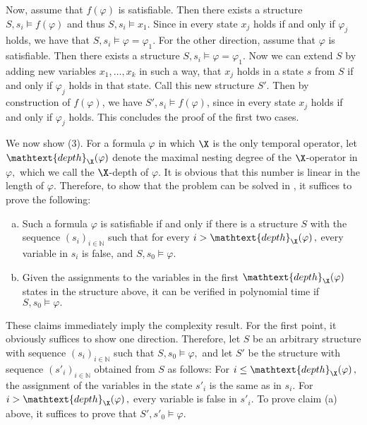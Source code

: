     Now, assume that $f(\varphi)$ is satisfiable. Then there exists a structure
    $S, s_i \vDash f(\varphi)$ and thus $S, s_i \vDash x_1$. Since in every state $x_j$ holds if and only if $\varphi_j$ holds,
    we have that $S, s_i \vDash \varphi = \varphi_1$. For the other direction, assume that $\varphi$ is satisfiable.
    Then there exists a structure $S,s_i \vDash \varphi=\varphi_1$. Now we can extend $S$ by adding new variables
    $x_1,\dots,x_k$ in such a way, that $x_j$ holds in a state $s$ from $S$ if and only if $\varphi_j$ holds in that state.
    Call this new structure $S'$. Then by construction of $f(\varphi)$, we have $S',s_i \vDash f(\varphi)$, since in every state
    $x_j$ holds if and only if $\varphi_j$ holds.
    \ifreport
      This concludes the proof of the first two cases.

      \bigskip\noindent
    \newcommand{\xdepth}[1]{\mathtext{depth}_{\X}\!\left(#1\right)}We now show (3). For a formula $\varphi$ in which $\X$ is the only temporal operator, let $\xdepth\varphi$ denote the maximal nesting degree of the $\X$-operator in $\varphi,$ which we call the $\X$-depth of $\varphi.$ It is obvious that this number is linear in the length of $\varphi.$ Therefore, to show that the problem can be solved in \NP, it suffices to prove the following:

    \begin{enumerate}[(a)]
	\item Such a formula $\varphi$ is satisfiable if and only if there is a structure $S$ with the sequence $(s_i)_{i\in\mathbb N}$ such that for every $i>\xdepth\varphi,$ every variable in $s_i$ is false, and $S,s_0\models\varphi.$
        \item Given the assignments to the variables in the first $\xdepth\varphi$ states in the structure above, it can be verified in polynomial time if $S,s_0\models\varphi.$
    \end{enumerate}

    These claims immediately imply the complexity result. For the first point, it obviously suffices to show one direction. Therefore, let $S$ be an arbitrary structure with sequence $(s_i)_{i\in\mathbb{N}}$ such that $S,s_0\models\varphi,$ and let $S'$ be the structure with sequence $(s'_i)_{i\in\mathbb N}$ obtained from $S$ as follows: For $i\leq\xdepth\varphi,$ the assignment of the variables in the state $s'_i$ is the same as in $s_i.$ For $i>\xdepth\varphi,$ every variable is false in $s'_i.$ To prove claim (a) above, it suffices to prove that $S',s'_0\models\varphi.$

